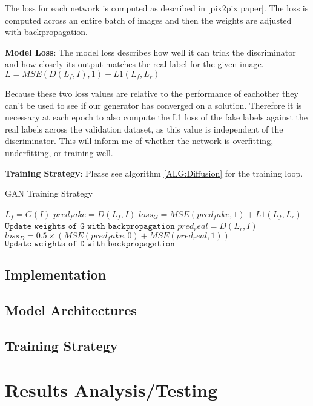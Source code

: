 \documentclass{UoYCSproject}
\begin{document}
The loss for each network is computed as described in [pix2pix paper]. The loss is computed across an entire batch of images and then the weights are adjusted with backpropagation.

\textbf{Model Loss}:
The model loss describes how well it can trick the discriminator and how closely its output matches the real label for the given image.
$ L = MSE( D(L_{f}, I), 1 ) + L1(L_{f}, L_{r}) $

Because these two loss values are relative to the performance of eachother they can't be used to see if our generator has converged on a solution. Therefore it is necessary at each epoch to also compute the L1 loss of the fake labels against the real labels across the validation dataset, as this value is independent of the discriminator. This will inform me of whether the network is overfitting, underfitting, or training well. 

\textbf{Training Strategy}: Please see algorithm \ref{ALG:Diffusion} for the training loop.

\begin{algorithm}
\caption{GAN Training Strategy}\label{ALG:Diffusion}
\begin{algorithmic}[1]
\State
\State $L_{f} = G(I)$
\State
\State $pred_fake = D(L_{f}, I) $
\State $loss_G = MSE( pred_fake, 1 ) + L1(L_{f}, L_{r}) $
\State $\texttt{Update weights of G with backpropagation}$
\State
\State $pred_real = D(L_{r}, I)$
\State $loss_D = 0.5 \times  ( MSE( pred_fake, 0) + MSE( pred_real, 1) ) $
\State $\texttt{Update weights of D with backpropagation}$
\State
\EndFor
\end{algorithmic}
\end{algorithm}


\subsection{Implementation}
\subsection{Model Architectures}
\subsection{Training Strategy}

\section{Results Analysis/Testing}
\end{document}
